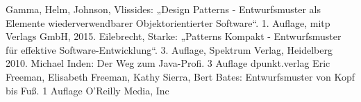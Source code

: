 \begin{thebibliography}{5cm}
  Gamma, Helm, Johnson, Vlissides: „Design Patterns -
Entwurfsmuster als Elemente wiederverwendbarer
Objektorientierter Software“.
1. Auflage, mitp Verlags GmbH, 2015.
    Eilebrecht, Starke: „Patterns Kompakt - Entwurfsmuster für
effektive Software-Entwicklung“.
3. Auflage, Spektrum Verlag, Heidelberg 2010.
    Michael Inden: Der Weg zum Java-Profi. 3 Auflage dpunkt.verlag
  Eric Freeman, Elisabeth Freeman, Kathy Sierra, Bert Bates: Entwurfsmuster von Kopf bis Fuß. 1 Auflage O'Reilly Media, Inc
\end{thebibliography}


